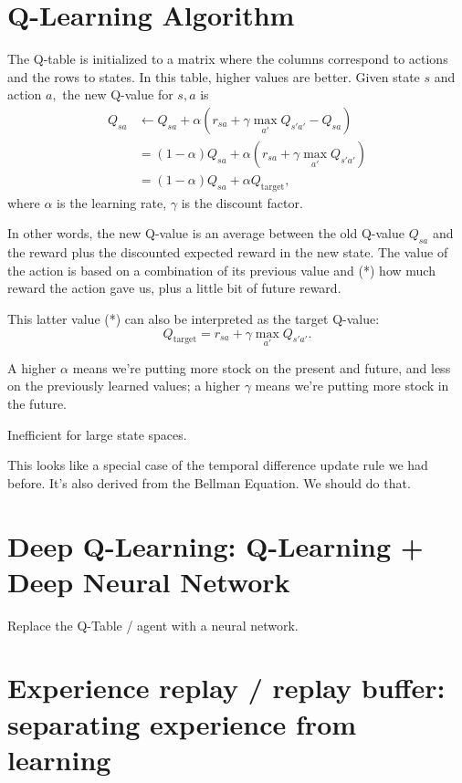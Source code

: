\documentclass[20pt]{extarticle}
\theoremstyle{plain}
\theoremstyle{definition}
\theoremstyle{remark}
\newcommand{\0}{\varnothing}
\newcommand{\<}{\langle}
\renewcommand{\>}{\rangle}
\begin{document}
\section{Q-Learning Algorithm}

The Q-table is initialized to a matrix where the columns correspond to actions
and the rows to states. In this table, higher values are better. Given state \(
s \) and action \( a, \) the new Q-value for \( s,  a \) is
\begin{align*}
Q_{sa} &\gets Q_{sa} + \alpha (r_{sa} + \gamma \max_{a'} Q_{s'a'} - Q_{sa}) \\
&= (1 - \alpha) Q_{sa} + \alpha (r_{sa} + \gamma \max_{a'} Q_{s'a'}) \\
&= (1 - \alpha) Q_{sa} + \alpha Q_{\text{target}},
\end{align*}
where \( \alpha \) is the learning rate, \( \gamma \) is the discount factor.

In other words, the new Q-value is an average between the old Q-value \( Q_{sa}
\) and the reward plus the discounted expected reward in the new state. The
value of the action is based on a combination of its previous value and (*) how much
reward the action gave us, plus a little bit of future reward.

This latter value (*) can also be interpreted as the target Q-value:
$$
Q_{\text{target}} = r_{sa} + \gamma \max_{a'} Q_{s'a'}.
$$

A higher \(\alpha \) means we're
putting more stock on the present and future, and less on the previously learned
values; a higher \( \gamma \) means we're putting more stock in the future.

Inefficient for large state spaces.

This looks like a special case of the temporal difference update rule we had
before. It's also derived from the Bellman Equation. We should do that.

\section{Deep Q-Learning: Q-Learning + Deep Neural Network}

Replace the Q-Table / agent with a neural network.

\section{Experience replay / replay buffer: separating experience from learning}
\end{document}
